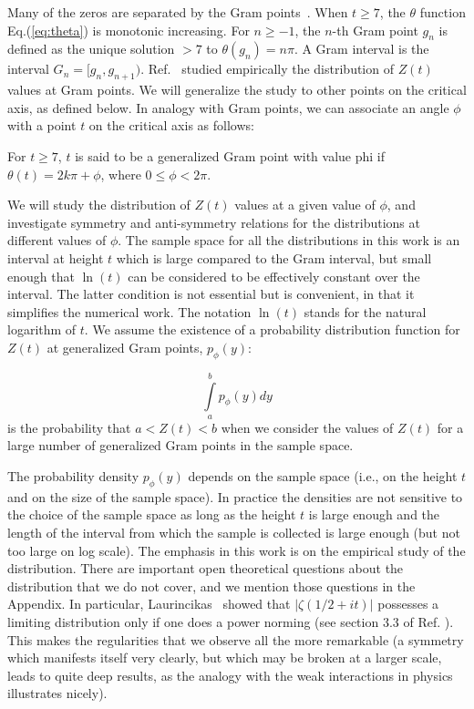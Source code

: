 \documentclass[twoside]{article}
\begin{document}
Many of the zeros are separated by the
Gram points~\cite{Gram 1903}.  When $t \ge 7$, the $\theta$ function Eq.(\ref{eq:theta}) is monotonic increasing. 
For $n \ge -1$, the $n$-th Gram point $g_n$ is defined as the unique solution $> 7$ to
$\theta (g_n) = n\pi$. A Gram interval is the interval $G_n = [g_n,g_{n+1})$.
Ref.~\cite{Shanker 2018} studied empirically the distribution of $Z(t)$ values at Gram points. We will generalize the study to other points on
the critical axis, as defined below. In analogy with Gram points, we can associate an angle $\phi$ with a point $t$ on the critical axis as follows:
\begin{definition}\label{phi}
For $t \ge 7$, $t$ is said to be a generalized Gram point with value phi if
$\theta (t) = 2k\pi + \phi$, where $0 \le \phi < 2\pi$.
\end{definition}
We will study the distribution of $Z(t)$ values at a given value of $\phi$, and investigate symmetry and anti-symmetry relations for the 
distributions at different values of $\phi$. The sample space for all the distributions in this work is an interval  at height $t$ which is large compared to the Gram interval, but small enough that $\ln (t)$ can be considered to be effectively constant over  the interval. 
The latter condition is not essential but is convenient, in that it simplifies the numerical work. The notation $\ln (t)$ stands for the natural logarithm of $t$.  We assume the existence of a  probability distribution function for $Z(t)$ at generalized Gram  points, $p_{\phi}(y)$:
\begin{definition}\label{pphi}
\begin{equation}
\int\limits_{a}^{b} p_{\phi}(y)dy
\label{eq:pdfphi}
\end{equation}
is the probability that $a<Z(t)<b$ when we consider the values of $Z(t)$ for a large number of generalized Gram points in the sample space. 
\end{definition}
The probability density  $p_{\phi}(y)$ depends on the sample space (i.e., on the height $t$ and on the size of the sample space). In practice the densities are not sensitive to the choice of the sample space as long as the height $t$ is large enough and the length of the interval from which the sample is collected is large enough (but not too large on log scale). The emphasis in this work is on the empirical study of the distribution. There are important open theoretical questions about the distribution that we do not cover, and we mention those questions in the Appendix.
 In particular, Laurincikas~\cite{Laurincikas} showed  that $|\zeta(1/2+it)|$
 possesses a limiting distribution only if one does a power norming (see section 3.3 of Ref. \cite{Laurincikas}). This makes the regularities that we observe all the more remarkable (a symmetry which manifests
 itself very clearly, but which may be broken at a larger scale, leads to quite deep results, as the analogy with the weak interactions in physics 
 illustrates nicely).
\end{document}
